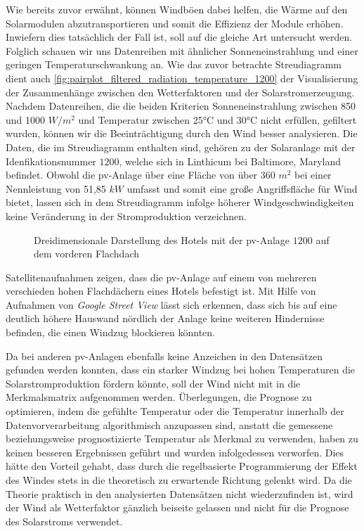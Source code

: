 \documentclass[12pt, a4paper]{article}
\begin{document}
Wie bereits zuvor erwähnt, können Windböen dabei helfen, die Wärme auf den Solarmodulen abzutransportieren und somit die Effizienz der Module erhöhen. Inwiefern dies tatsächlich der Fall ist, soll auf die gleiche Art untersucht werden. Folglich schauen wir uns Datenreihen mit ähnlicher Sonneneinstrahlung und einer geringen Temperaturschwankung an. Wie das zuvor betrachte Streudiagramm dient auch \autoref{fig:pairplot_filtered_radiation_temperature_1200} der Visualisierung der Zusammenhänge zwischen den Wetterfaktoren und der Solarstromerzeugung. Nachdem Datenreihen, die die beiden Kriterien Sonneneinstrahlung zwischen 850 und 1000 $W/ m^2$ und Temperatur zwischen 25°C und 30°C nicht erfüllen, gefiltert wurden, können wir die Beeinträchtigung durch den Wind besser analysieren. Die Daten, die im Streudiagramm enthalten sind, gehören zu der Solaranlage mit der Idenfikationsnummer $1200$, welche sich in Linthicum bei Baltimore, Maryland befindet. Obwohl die \ac{pv}-Anlage über eine Fläche von über 360 $m^2$ bei einer Nennleistung von 51,85 $kW$ umfasst und somit eine große Angriffsfläche für Wind bietet, lassen sich in dem Streudiagramm infolge höherer Windgeschwindigkeiten keine Veränderung in der Stromproduktion verzeichnen. 


\begin{figure}
\centering
\def\svgwidth{425pt}

\caption{Dreidimensionale Darstellung des Hotels mit der \ac{pv}-Anlage $1200$ auf dem vorderen Flachdach}
\label{pic:solarsystem_1200_picture}
\end {figure}

Satellitenaufnahmen zeigen, dass die \ac{pv}-Anlage auf einem von mehreren verschieden hohen Flachdächern eines Hotels befestigt ist. Mit Hilfe von Aufnahmen von \textit{Google Street View} lässt sich erkennen, dass sich bis auf eine deutlich höhere Hauswand nördlich der Anlage keine weiteren Hindernisse befinden, die einen Windzug blockieren könnten.

Da bei anderen \ac{pv}-Anlagen ebenfalls keine Anzeichen in den Datensätzen gefunden werden konnten, dass ein starker Windzug bei hohen Temperaturen die Solarstromproduktion fördern könnte, soll der Wind nicht mit in die Merkmalsmatrix aufgenommen werden. Überlegungen, die Prognose zu optimieren, indem die gefühlte Temperatur oder die Temperatur innerhalb der Datenvorverarbeitung algorithmisch anzupassen sind, anstatt die gemessene beziehungsweise prognostizierte Temperatur als Merkmal zu verwenden, haben zu keinen besseren Ergebnissen geführt und wurden infolgedessen verworfen. Dies hätte den Vorteil gehabt, dass durch die regelbasierte Programmierung der Effekt des Windes stets in die theoretisch zu erwartende Richtung gelenkt wird. Da die Theorie praktisch in den analysierten Datensätzen nicht wiederzufinden ist, wird der Wind als Wetterfaktor gänzlich beiseite gelassen und nicht für die Prognose des Solarstroms verwendet.
\end{document}
